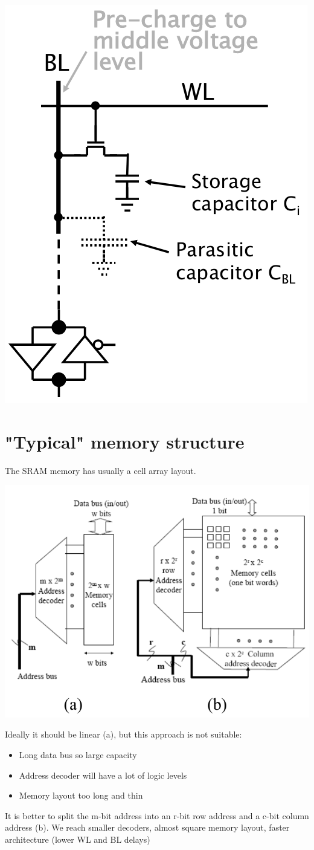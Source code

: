 \includegraphics[width=.4\textwidth]{images/DRAM_scheme.png}

\section{"Typical" memory structure}
The SRAM memory has usually a cell array layout.

\includegraphics[width=\textwidth]{images/SRAM_scheme.png}

Ideally it should be linear (a), but this approach is not suitable:
\begin{itemize}
    \item Long data bus so large capacity
    \item Address decoder will have a lot of logic levels
    \item Memory layout too long and thin
\end{itemize}

It is better to split the m-bit address into an r-bit row address and a c-bit column address (b). 
We reach smaller decoders, almost square memory layout, faster architecture (lower WL and BL delays)

